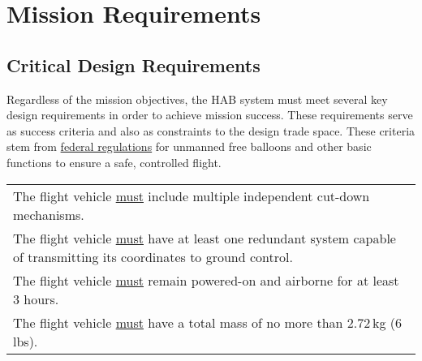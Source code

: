 
\section{Mission Requirements}
\subsection{Critical Design Requirements}
Regardless of the mission objectives, the HAB system must meet several key
design requirements in order to achieve mission success. These requirements
serve as success criteria and also as constraints to the design trade space.
These criteria stem from
\href{https://www.ecfr.gov/cgi-bin/text-idx?rgn=div5&node=14:2.0.1.3.15#sp14.2.101.d}{federal
regulations} for unmanned free balloons and other basic functions to ensure
a safe, controlled flight.

\begin{table}[ht]
    \centering
    \begin{tabularx}{\textwidth}{X}
        The flight vehicle \underline{must} include multiple independent
        cut-down mechanisms.                                       \\
        The flight vehicle \underline{must} have at least one redundant system
        capable of transmitting its coordinates to ground control. \\
        The flight vehicle \underline{must} remain powered-on and airborne for
        at least 3 hours.                                          \\
        The flight vehicle \underline{must} have a total mass of no more than
        2.72\,kg (6\,lbs).                                         \\
    \end{tabularx}
    \label{mission-reqs:key-requirements}
\end{table}

